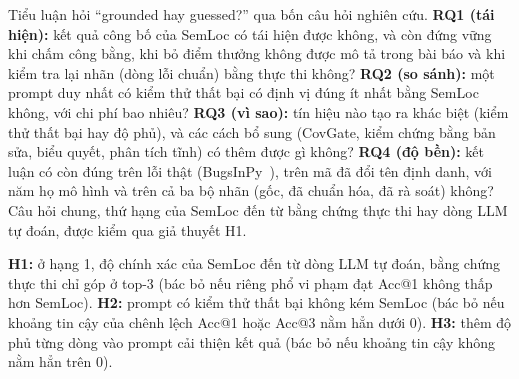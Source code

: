 Tiểu luận hỏi ``grounded hay guessed?'' qua bốn câu hỏi nghiên cứu.
\textbf{RQ1 (tái hiện):} kết quả công bố của SemLoc có tái hiện được không, và còn đứng vững khi chấm công bằng, khi bỏ
điểm thưởng không được mô tả trong bài báo và khi kiểm tra lại nhãn (dòng lỗi chuẩn) bằng thực thi không?
\textbf{RQ2 (so sánh):} một prompt duy nhất có kiểm thử thất bại có định vị đúng ít nhất bằng SemLoc không, với chi phí
bao nhiêu?
\textbf{RQ3 (vì sao):} tín hiệu nào tạo ra khác biệt (kiểm thử thất bại hay độ phủ), và các cách bổ sung (CovGate, kiểm
chứng bằng bản sửa, biểu quyết, phân tích tĩnh) có thêm được gì không?
\textbf{RQ4 (độ bền):} kết luận có còn đúng trên lỗi thật (BugsInPy~\cite{widyasari2020}), trên mã đã đổi tên định danh,
với năm họ mô hình và trên cả ba bộ nhãn (gốc, đã chuẩn hóa, đã rà soát) không?
\label{sec:rq}%
Câu hỏi chung, thứ hạng của SemLoc đến từ bằng chứng thực thi hay dòng LLM tự đoán, được kiểm qua giả thuyết H1.

\textbf{H1:} ở hạng 1, độ chính xác của SemLoc đến từ dòng LLM tự đoán, bằng chứng thực thi chỉ góp ở top-3 (bác bỏ nếu
riêng phổ vi phạm đạt Acc@1 không thấp hơn SemLoc). \textbf{H2:} prompt có kiểm thử thất bại không kém SemLoc (bác bỏ nếu
khoảng tin cậy của chênh lệch Acc@1 hoặc Acc@3 nằm hẳn dưới 0). \textbf{H3:} thêm độ phủ từng dòng vào prompt cải thiện
kết quả (bác bỏ nếu khoảng tin cậy không nằm hẳn trên 0).


